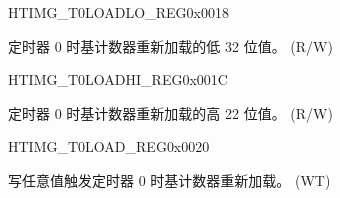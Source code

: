 \begin{register}{H}{TIMG\_T0LOADLO\_REG}{0x0018}\label{regdesc:TIMGTXLOADLOREG}
%
\regnewline%
\begin{regdesc}\begin{reglist}
\label{fielddesc:TIMGTXLOADLO}\item [TIMG\_T0\_LOAD\_LO] 定时器 0 时基计数器重新加载的低 32 位值。 (R/W)
\end{reglist}\end{regdesc}
\end{register}


\begin{register}{H}{TIMG\_T0LOADHI\_REG}{0x001C}\label{regdesc:TIMGTXLOADHIREG}
%
%
\regnewline%
\begin{regdesc}\begin{reglist}
\label{fielddesc:TIMGTXLOADHI}\item [TIMG\_T0\_LOAD\_HI] 定时器 0 时基计数器重新加载的高 22 位值。 (R/W)
\end{reglist}\end{regdesc}
\end{register}


\begin{register}{H}{TIMG\_T0LOAD\_REG}{0x0020}\label{regdesc:TIMGTXLOADREG}
%
\regnewline%
\begin{regdesc}\begin{reglist}
\label{fielddesc:TIMGTXLOAD}\item [TIMG\_T0\_LOAD] 写任意值触发定时器 0 时基计数器重新加载。 (WT)
\end{reglist}\end{regdesc}
\end{register}


